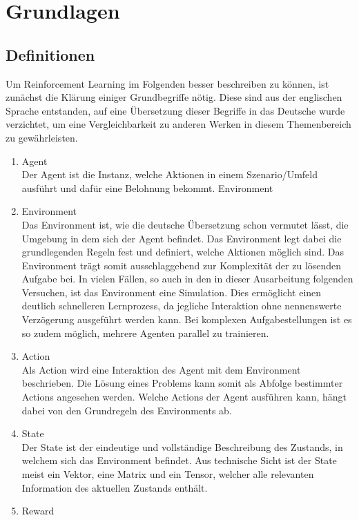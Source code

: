 \section{Grundlagen}


\subsection{Definitionen}
Um Reinforcement Learning im Folgenden besser beschreiben zu können, ist zunächst die Klärung einiger Grundbegriffe nötig. Diese sind aus der englischen Sprache entstanden, auf eine Übersetzung dieser Begriffe in das Deutsche wurde verzichtet, um eine Vergleichbarkeit zu anderen Werken in diesem Themenbereich zu gewährleisten.\\

\begin{enumerate}
    \item Agent\\
    Der Agent ist die Instanz, welche Aktionen in einem Szenario/Umfeld ausführt und dafür eine Belohnung bekommt.
    Environment
    \item Environment\\
    Das Environment ist, wie die deutsche Übersetzung schon vermutet lässt, die Umgebung in dem sich der Agent befindet. Das Environment legt dabei die grundlegenden Regeln fest und definiert, welche Aktionen möglich sind. Das Environment trägt somit ausschlaggebend zur Komplexität der zu lösenden Aufgabe bei. In vielen Fällen, so auch in den in dieser Ausarbeitung folgenden Versuchen, ist das Environment eine Simulation. Dies ermöglicht einen deutlich schnelleren Lernprozess, da jegliche Interaktion ohne nennenswerte Verzögerung ausgeführt werden kann. Bei komplexen Aufgabestellungen ist es so zudem möglich, mehrere Agenten parallel zu trainieren.
    \item Action\\
    Als Action wird eine Interaktion des Agent mit dem Environment beschrieben. Die Lösung eines Problems kann somit als Abfolge bestimmter Actions angesehen werden. Welche Actions der Agent ausführen kann, hängt dabei von den Grundregeln des Environments ab.
    \item State\\
    Der State ist der eindeutige und vollständige Beschreibung des Zustands, in welchem sich das Environment befindet. Aus technische Sicht ist der State meist ein Vektor, eine Matrix und ein Tensor, welcher alle relevanten Information des aktuellen Zustands enthält.
    \item Reward\\

\end{enumerate}
